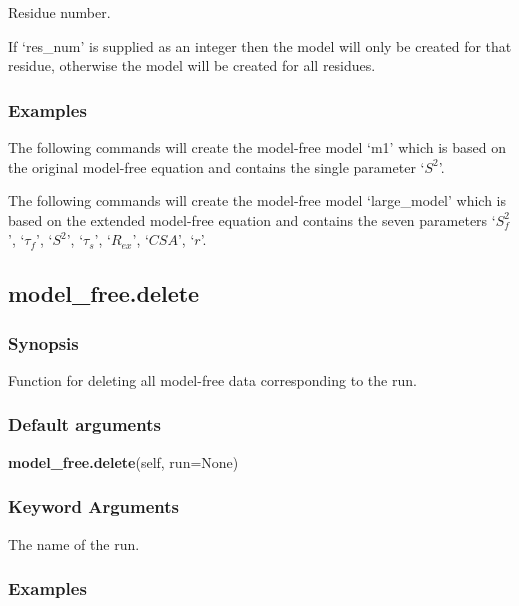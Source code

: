 Residue number.

If `res\_num' is supplied as an integer then the model will only be created for that residue,
otherwise the model will be created for all residues.


\subsubsection{Examples}

The following commands will create the model-free model `m1' which is based on the original
model-free equation and contains the single parameter `$S^2$'.



The following commands will create the model-free model `large\_model' which is based on the
extended model-free equation and contains the seven parameters `$S^2_f$', `$\tau_f$', `$S^2$', `$\tau_s$',
`$R_{ex}$', `$CSA$', `$r$'.




\newpage

\subsection{model\_free.delete}


\subsubsection{Synopsis}

Function for deleting all model-free data corresponding to the run.

\subsubsection{Default arguments}

\textsf{\textbf{model\_free.delete}(self, run=None)}


\subsubsection{Keyword Arguments}

  The name of the run.

\subsubsection{Examples}

